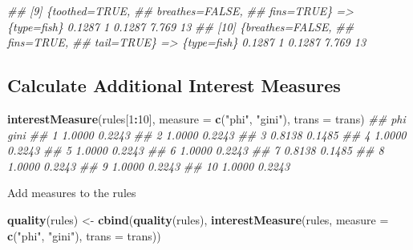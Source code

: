 \documentclass[
  notitlepage]{book}
\newenvironment{Shaded}{\begin{snugshade}}{\end{snugshade}}
\newcommand{\CommentTok}[1]{\textcolor[rgb]{0.56,0.35,0.01}{\textit{#1}}}
\newcommand{\DataTypeTok}[1]{\textcolor[rgb]{0.13,0.29,0.53}{#1}}
\newcommand{\DecValTok}[1]{\textcolor[rgb]{0.00,0.00,0.81}{#1}}
\newcommand{\KeywordTok}[1]{\textcolor[rgb]{0.13,0.29,0.53}{\textbf{#1}}}
\newcommand{\NormalTok}[1]{#1}
\newcommand{\OperatorTok}[1]{\textcolor[rgb]{0.81,0.36,0.00}{\textbf{#1}}}
\newcommand{\StringTok}[1]{\textcolor[rgb]{0.31,0.60,0.02}{#1}}
\begin{document}
\begin{Shaded}
\begin{Highlighting}[]
\CommentTok{\#\# [9]  \{toothed=TRUE,                                                          }
\CommentTok{\#\#       breathes=FALSE,                                                        }
\CommentTok{\#\#       fins=TRUE\}       =\textgreater{} \{type=fish\}  0.1287          1   0.1287 7.769    13}
\CommentTok{\#\# [10] \{breathes=FALSE,                                                        }
\CommentTok{\#\#       fins=TRUE,                                                             }
\CommentTok{\#\#       tail=TRUE\}       =\textgreater{} \{type=fish\}  0.1287          1   0.1287 7.769    13}
\end{Highlighting}
\end{Shaded}

\hypertarget{calculate-additional-interest-measures}{%
\subsection{Calculate Additional Interest Measures}\label{calculate-additional-interest-measures}}

\begin{Shaded}
\begin{Highlighting}[]
\KeywordTok{interestMeasure}\NormalTok{(rules[}\DecValTok{1}\OperatorTok{:}\DecValTok{10}\NormalTok{], }\DataTypeTok{measure =} \KeywordTok{c}\NormalTok{(}\StringTok{"phi"}\NormalTok{, }\StringTok{"gini"}\NormalTok{),}
  \DataTypeTok{trans =}\NormalTok{ trans)}
\CommentTok{\#\#       phi   gini}
\CommentTok{\#\# 1  1.0000 0.2243}
\CommentTok{\#\# 2  1.0000 0.2243}
\CommentTok{\#\# 3  0.8138 0.1485}
\CommentTok{\#\# 4  1.0000 0.2243}
\CommentTok{\#\# 5  1.0000 0.2243}
\CommentTok{\#\# 6  1.0000 0.2243}
\CommentTok{\#\# 7  0.8138 0.1485}
\CommentTok{\#\# 8  1.0000 0.2243}
\CommentTok{\#\# 9  1.0000 0.2243}
\CommentTok{\#\# 10 1.0000 0.2243}
\end{Highlighting}
\end{Shaded}

Add measures to the rules

\begin{Shaded}
\begin{Highlighting}[]
\KeywordTok{quality}\NormalTok{(rules) \textless{}{-}}\StringTok{ }\KeywordTok{cbind}\NormalTok{(}\KeywordTok{quality}\NormalTok{(rules),}
  \KeywordTok{interestMeasure}\NormalTok{(rules, }\DataTypeTok{measure =} \KeywordTok{c}\NormalTok{(}\StringTok{"phi"}\NormalTok{, }\StringTok{"gini"}\NormalTok{),}
    \DataTypeTok{trans =}\NormalTok{ trans))}
\end{Highlighting}
\end{Shaded}
\end{document}
